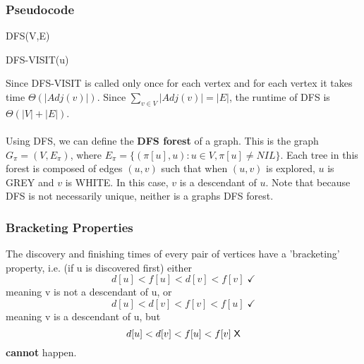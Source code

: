 \documentclass{article}
\begin{document}
        \subsubsection{Pseudocode}
            DFS(V,E)
            \begin{algorithmic}[1]
                \EndFor
                    \EndIf
                \EndFor
            \end{algorithmic}
            DFS-VISIT(u)
            \begin{algorithmic}[1]
                    \EndIf
                \EndFor
            \end{algorithmic}
            Since DFS-VISIT is called only once for each vertex and for each vertex it takes time $\Theta (|Adj(v)|)$. Since $\sum_{v \in V}|Adj(v)| = |E|$, the runtime of DFS is $\Theta(|V| + |E|)$. \\ \\
            Using DFS, we can define the \textbf{DFS forest} of a graph. This is the graph $G_\pi = (V, E_\pi)$, where $E_\pi = \{ (\pi [u],u ) : u \in V, \pi [u] \neq NIL \} $. Each tree in this forest is composed of edges $(u,v)$ such that when $(u,v)$ is explored, $u$ is GREY and $v$ is WHITE. In this case, $v$ is a descendant of $u$. Note that because DFS is not necessarily unique, neither is a graphs DFS forest.  
        \subsubsection{Bracketing Properties}
            The discovery and finishing times of every pair of vertices have a 'bracketing' property, i.e. (if u is discovered first) either
            \[ d[u] < f[u] < d[v] < f[v] \; \checkmark \]
            meaning v is not a descendant of u, or
            \[ d[u] < d[v] < f[v] < f[u] \; \checkmark \]
            meaning v is a descendant of u, but
            \[ d[u] < d[v] < f[u] < f[v] \; \text{\sffamily X} \]
            \textbf{cannot} happen. \\ \\
\end{document}
